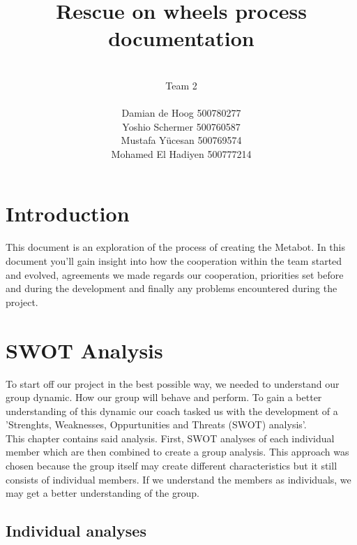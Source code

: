 \documentclass[12pt]{article}
\begin{document}
	\title{\huge Rescue on wheels process documentation}
	\author{\\Team 2\\ \\Damian de Hoog 500780277\\ Yoshio Schermer 500760587\\Mustafa Y\"{u}cesan 500769574\\ Mohamed El Hadiyen 500777214}
	\maketitle
	\newpage
	\tableofcontents
	\newpage
	\section{Introduction}
	This document is an exploration of the process of creating the Metabot. In this document you'll gain insight into how the cooperation within the team started and evolved, agreements we made regards our cooperation, priorities set before and during the development and finally any problems encountered during the project.
	\newpage
	\section{SWOT Analysis}
	To start off our project in the best possible way, we needed to understand our group dynamic. How our group will behave and perform. To gain a better understanding of this dynamic our coach tasked us with the development of a 'Strenghts, Weaknesses, Oppurtunities and Threats (SWOT) analysis'.\\ This chapter contains said analysis. First, SWOT analyses of each individual member which are then combined to create a group analysis. This approach was chosen because the group itself may create different characteristics but it still consists of individual members. If we understand the members as individuals, we may get a better understanding of the group. 
	
	\subsection{Individual analyses}
\end{document}
